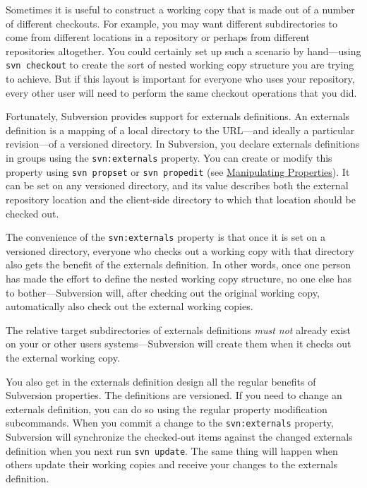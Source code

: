 Sometimes it is useful to construct a working copy that is made out of a
number of different checkouts. For example, you may want different
subdirectories to come from different locations in a repository or
perhaps from different repositories altogether. You could certainly set
up such a scenario by hand---using \texttt{svn\ checkout} to create the
sort of nested working copy structure you are trying to achieve. But if
this layout is important for everyone who uses your repository, every
other user will need to perform the same checkout operations that you
did.

Fortunately, Subversion provides support for externals definitions. An
externals definition is a mapping of a local directory to the URL---and
ideally a particular revision---of a versioned directory. In Subversion,
you declare externals definitions in groups using the
\texttt{svn:externals} property. You can create or modify this property
using \texttt{svn\ propset} or \texttt{svn\ propedit} (see
\hyperref[svn.advanced.props.manip]{Manipulating Properties}). It can be
set on any versioned directory, and its value describes both the
external repository location and the client-side directory to which that
location should be checked out.

The convenience of the \texttt{svn:externals} property is that once it
is set on a versioned directory, everyone who checks out a working copy
with that directory also gets the benefit of the externals definition.
In other words, once one person has made the effort to define the nested
working copy structure, no one else has to bother---Subversion will,
after checking out the original working copy, automatically also check
out the external working copies.

The relative target subdirectories of externals definitions \emph{must
not} already exist on your or other users\textquotesingle{}
systems---Subversion will create them when it checks out the external
working copy.

You also get in the externals definition design all the regular benefits
of Subversion properties. The definitions are versioned. If you need to
change an externals definition, you can do so using the regular property
modification subcommands. When you commit a change to the
\texttt{svn:externals} property, Subversion will synchronize the
checked-out items against the changed externals definition when you next
run \texttt{svn\ update}. The same thing will happen when others update
their working copies and receive your changes to the externals
definition.

